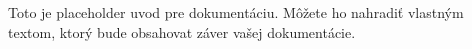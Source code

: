 Toto je placeholder uvod pre dokumentáciu. Môžete ho nahradiť vlastným textom, ktorý bude obsahovat záver vašej dokumentácie.